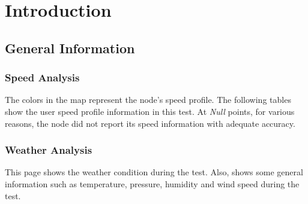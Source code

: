 \chapter{Introduction}

\clearpage
\section{General Information}
\vfill
{}
\vfill

\clearpage
{}


\clearpage
\subsection{Speed Analysis}
The colors in the map represent the node's speed profile. The following tables show the user speed profile information in this test. At \textit{Null} points, for various reasons, the node did not report its speed information with adequate accuracy.
\vfill
{}
\vfill
{}
\vfill

\clearpage
\subsection{Weather Analysis}
This page shows the weather condition during the test. Also, shows some general information such as temperature, pressure, humidity and wind speed during the test.
\vfill
{}
\vfill
